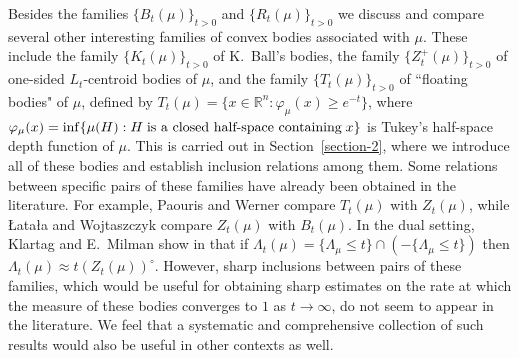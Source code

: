 \documentclass[11pt,leqno]{article}
\theoremstyle{definition}
\theoremstyle{remark}
\numberwithin{equation}{section}
\newcommand{\ls}{\leqslant}
\newcommand{\gr}{\geqslant}
\newcommand{\1}{\textbf{1}}
\begin{document}
Besides the families $\{B_t(\mu)\}_{t>0}$ and $\{R_t(\mu)\}_{t>0}$ we discuss and compare several other interesting
families of convex bodies associated with $\mu$. These include the family $\{K_t(\mu)\}_{t>0}$ of K.~Ball's bodies, the family
$\{Z_t^+(\mu)\}_{t>0}$ of one-sided $L_t$-centroid bodies of $\mu$, and the family $\{T_t(\mu)\}_{t>0}$ of ``floating
bodies" of $\mu$, defined by $T_t(\mu)=\{x\in \mathbb{R}^n:\varphi_{\mu}(x)\gr e^{-t}\}$,
where $\varphi_{\mu }(x)=\inf\{\mu (H):H\;\hbox{is a closed half-space containing}\;x\}$
is Tukey's half-space depth function of $\mu$. This is carried out in Section~\ref{section-2}, where we introduce all of these
bodies and establish inclusion relations among them. Some relations  between specific pairs of these families have already been obtained in the
literature. For example, Paouris and Werner \cite[Theorem~2.2]{Paouris-Werner-2012} compare $T_t(\mu)$ with $Z_t(\mu)$, while 
\L ata\l a and Wojtaszczyk \cite[Proposition~3.2 and~3.5]{Latala-Wojtaszczyk-2008} compare $Z_t(\mu)$ with $B_t(\mu)$. In the
dual setting, Klartag and E.~Milman show in \cite[Lemma~2.3]{Klartag-EMilman-2012} that if $\Lambda_t(\mu)=\{\Lambda_{\mu}\ls t\}\cap (-\{\Lambda_{\mu}\ls t\})$ then
$\Lambda_t(\mu)\approx t(Z_t(\mu))^{\circ}$. However, sharp inclusions between pairs of these families, which would be useful for obtaining sharp
estimates on the rate at which the measure of these bodies converges to $1$ as $t\to\infty$, do not seem to appear
in the literature. We feel that a systematic and comprehensive collection of such results would also be useful
in other contexts as well.
\end{document}
